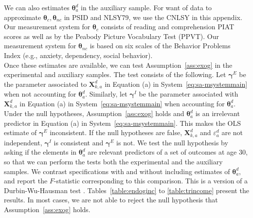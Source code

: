 \noindent We can also estimates $\bm{\theta}_{a}^d$ in the auxiliary sample. For want of data to approximate $\bm{\theta}_{c}, \bm{\theta}_{nc}$ in PSID and NLSY79, we use the CNLSY in this appendix. Our measurement system for $\bm{\theta}_{c}$ consists of reading and comprehension PIAT scores as well as by the Peabody Picture Vocabulary Test (PPVT). Our measurement system for $\bm{\theta}_{nc}$ is based on six scales of the Behavior Problems Index (e.g., anxiety, dependency, social behavior).\\

\noindent Once these estimates are available, we can test Assumption~\ref{ass:exog} in the experimental and auxiliary samples. The test consists of the following. Let $\bm{\gamma}^E$ be the parameter associated to $\bm{X}^d_{k,a}$ in Equation (a) in System~\eqref{eq:sa-msystemmain} when not accounting for $\bm{\theta}_{a}^d$. Similarly, let $\bm{\gamma}^I$ be the parameter associated with $\bm{X}^d_{k,a}$ in Equation (a) in System~\eqref{eq:sa-msystemmain} when accounting for $\bm{\theta}_{a}^d$. Under the null hypotheses, Assumption~\ref{ass:exog} holds and $\bm{\theta}_{a}^d$ is an irrelevant predictor in Equation (a) in System~\eqref{eq:sa-msystemmain}. This makes the OLS estimate of $\bm{\gamma}^E$ inconsistent. If the null hypotheses are false, $\bm{X}^d_{k,a}$ and $\varepsilon_{a}^d$ are not independent, $\bm{\gamma}^I$ is consistent and $\bm{\gamma}^E$ is not. We test the null hypothesis by asking if the elements in $\bm{\theta}_{a}^d$ are relevant predictors of a set of outcomes at age 30, so that we can perform the tests both the experimental and the auxiliary samples. We contrast specifications with and without including estimates of $\bm{\theta}_{a}^d$, and report the $F$-statistic corresponding to this comparison. This is a version of a Durbin-Wu-Hausman test \citep[see][]{Durbin_1954_RISI,Wu_1973_Econometrica,Hausman_1978_Econometrica}. Tables~\ref{table:endoginc} to \ref{table:trincome} present the results. In most cases, we are not able to reject the null hypothesis that Assumption~\ref{ass:exog} holds.\\


